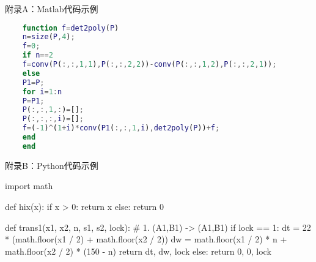 \appendix
\label{cod:matlab}
\newpage
\vspace*{-21.6pt}
\begin{center}
	\heiti
	附录A：Matlab代码示例
\end{center}


\begin{lstlisting}[language=Matlab]
	%这个是行列式转化的代码，作为示例
	function f=det2poly(P)
	n=size(P,4);
	f=0;
	if n==2  
	f=conv(P(:,:,1,1),P(:,:,2,2))-conv(P(:,:,1,2),P(:,:,2,1));  
	else
	P1=P;
	for i=1:n    
	P=P1;     
	P(:,:,1,:)=[];
	P(:,:,:,i)=[];   
	f=(-1)^(1+i)*conv(P1(:,:,1,i),det2poly(P))+f;   
	end
	end
\end{lstlisting}

\newpage
\begin{center}
	\heiti
	附录B：Python代码示例
\end{center}

\begin{python}
	import math
	
	
	def hix(x):
	if x > 0:
	return x
	else:
	return 0
	
	
	def trans1(x1, x2, n, s1, s2, lock):
	# 1.	(A1,B1) -> (A1,B1)
	if lock == 1:
	dt = 22 * (math.floor(x1 / 2) + math.floor(x2 / 2))
	dw = math.floor(x1 / 2) * n + math.floor(x2 / 2) * (150 - n)
	return dt, dw, lock
	else:
	return 0, 0, lock
\end{python}